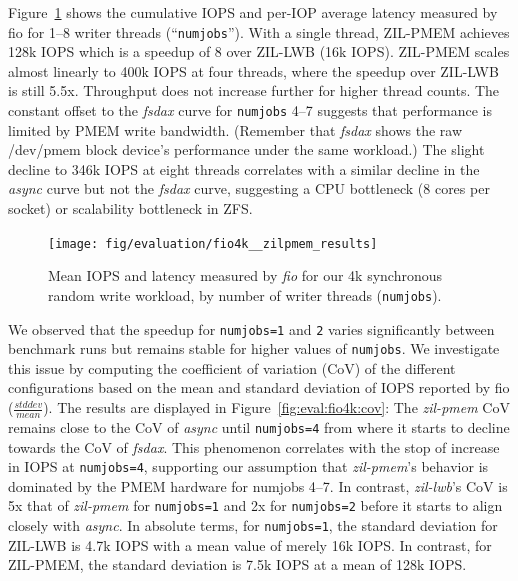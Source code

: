 \documentclass[12pt,a4paper,twoside]{book}
\begin{document}
{Figure~\ref{fig:eval:fio4k:metrics} shows the cumulative IOPS and per-IOP average latency measured by fio for 1--8 writer threads (``\lstinline{numjobs}'').
With a single thread, ZIL-PMEM achieves 128k IOPS which is a speedup of 8 over ZIL-LWB (16k IOPS).
ZIL-PMEM scales almost linearly to 400k IOPS at four threads, where the speedup over ZIL-LWB is still 5.5x.
Throughput does not increase further for higher thread counts.
The constant offset to the \textit{fsdax} curve for \lstinline{numjobs} 4--7 suggests that performance is limited by PMEM write bandwidth.
(Remember that \textit{fsdax} shows the raw /dev/pmem block device's performance under the same workload.)
The slight decline to 346k IOPS at eight threads correlates with a similar decline in the \textit{async} curve but not the \textit{fsdax} curve, suggesting a CPU bottleneck (8 cores per socket) or scalability bottleneck in ZFS.

\begin{figure}[H]
    \centering
    \texttt{[image: fig/evaluation/fio4k\_\_zilpmem\_results]}
    \caption{Mean IOPS and latency measured by \textit{fio} for our 4k synchronous random write workload, by number of writer threads (\lstinline{numjobs}).}
    \label{fig:eval:fio4k:metrics}
\end{figure}

We observed that the speedup for \lstinline{numjobs=1} and \lstinline{2} varies significantly between benchmark runs but remains stable for higher values of \lstinline{numjobs}.
We investigate this issue by computing the coefficient of variation (CoV) of the different configurations based on the mean and standard deviation of IOPS reported by fio ($\frac{stddev}{mean}$).
The results are displayed in Figure~\ref{fig:eval:fio4k:cov}:
The \textit{zil-pmem} CoV remains close to the CoV of \textit{async} until \lstinline{numjobs=4} from where it starts to decline towards the CoV of \textit{fsdax}.
This phenomenon correlates with the stop of increase in IOPS at \lstinline{numjobs=4}, supporting our assumption that \textit{zil-pmem}'s behavior is dominated by the PMEM hardware for numjobs 4--7.
In contrast, \textit{zil-lwb}'s CoV is 5x that of \textit{zil-pmem} for \lstinline{numjobs=1} and 2x for \lstinline{numjobs=2} before it starts to align closely with \textit{async}.
In absolute terms, for \lstinline{numjobs=1}, the standard deviation for ZIL-LWB is 4.7k IOPS with a mean value of merely 16k IOPS.
In contrast, for ZIL-PMEM, the standard deviation is 7.5k IOPS at a mean of 128k IOPS.

}
\end{document}

